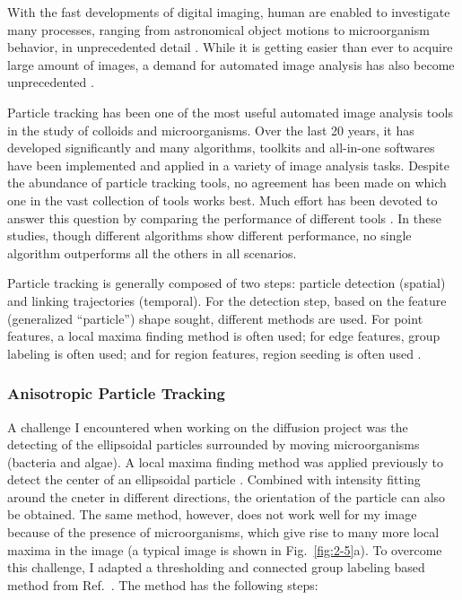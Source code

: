 With the fast developments of digital imaging, human are enabled to investigate many processes, ranging from astronomical object motions to microorganism behavior, in unprecedented detail \cite{Kalaidzidis2007}. While it is getting easier than ever to acquire large amount of images, a demand for automated image analysis has also become unprecedented \cite{Meijering2006, Jaqaman2008, Rohr2010}.

Particle tracking has been one of the most useful automated image analysis tools in the study of colloids and microorganisms. Over the last 20 years, it has developed significantly and many algorithms, toolkits and all-in-one softwares have been implemented and applied in a variety of image analysis tasks. Despite the abundance of particle tracking tools, no agreement has been made on which one in the vast collection of tools works best. Much effort has been devoted to answer this question by comparing the performance of different tools \cite{Kalaidzidis2007, Dorn2008, Meijering2009, Smal2010, Meijering2012,
Chenouard2014, Maska2014, Hilsenbeck2016}. In these studies, though different algorithms show different performance, no single algorithm outperforms all the others in all scenarios.

Particle tracking is generally composed of two steps: particle detection (spatial) and linking trajectories (temporal). For the detection step, based on the feature (generalized ``particle'') shape sought, different methods are used. For point features, a local maxima finding method is often used; for edge features, group labeling is often used; and for region features, region seeding is often used \cite{Dorn2008}.

\subsubsection{Anisotropic Particle Tracking}

A challenge I encountered when working on the diffusion project was the detecting of the ellipsoidal particles surrounded by moving microorganisms (bacteria and algae). A local maxima finding method was applied previously to detect the center of an ellipsoidal particle \cite{Han2006}. Combined with intensity fitting around the cneter in different directions, the orientation of the particle can also be obtained. The same method, however, does not work well for my image because of the presence of microorganisms, which give rise to many more local maxima in the image (a typical image is shown in Fig.~\ref{fig:2-5}a). To overcome this challenge, I adapted a thresholding and connected group labeling based method from Ref.~\cite{custom-feature-detection, Sauret2015, Cappello2015}. The method has the following steps:

